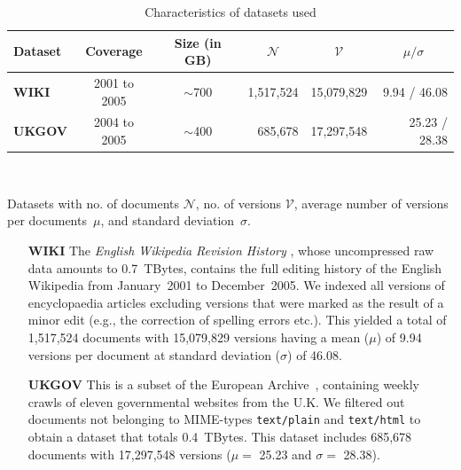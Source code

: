 \begin{table}
  \center
  \begin{tabular}{l c c r r r} 
      \toprule
      { Dataset} & \multicolumn{1}{c}{Coverage}&  \multicolumn{1}{c}{Size (in GB)} & \multicolumn{1}{c}{$\mathcal{N}$} & \multicolumn{1}{c}{$\mathcal{V}$} & \multicolumn{1}{c}{$\mu / \sigma$}\\
      \midrule
      {\bf WIKI} & 2001  to 2005  & $\sim$700 & 1,517,524 & 15,079,829 & 9.94 / 46.08\\

      {\bf UKGOV} & 2004 to 2005 & $\sim$400 & 685,678 & 17,297,548 & 25.23 / 28.38\\
      \bottomrule
    \end{tabular}\\
    \hspace*{2ex}\parbox{0.65\textwidth}{\fontsize{8pt}{8pt}\sffamily Datasets with no. of documents $\mathcal{N}$,
    no. of versions $\mathcal{V}$, average number of versions per documents~${\mu}$, and standard deviation~${\sigma}$.}
  \caption{Characteristics of datasets used}
  \label{tab:datasets}
\end{table}

\begin{enumerate}
\item[\textbf{WIKI}]
{The \emph{English Wikipedia Revision History}
    \cite{wiki}, whose uncompressed raw data amounts to 0.7~TBytes,
    contains the full editing history of the English Wikipedia from
    January~2001 to December~2005. We indexed all versions of
    encyclopaedia articles excluding versions that were marked as the
    result of a minor edit (e.g., the correction of spelling errors
    etc.). This yielded a total of 1,517,524 documents with 15,079,829
    versions having a mean ($\mu$) of 9.94 versions per document at
    standard deviation ($\sigma$) of 46.08.}
    
\item[\textbf{UKGOV}]
  { This is a subset of the European Archive~\cite{ea}, containing
    weekly crawls of eleven governmental websites from the U.K. We
    filtered out documents not belonging to MIME-types
    \texttt{text/plain} and \texttt{text/html} to obtain a dataset
    that totals 0.4~TBytes. This dataset includes 685,678 documents
    with 17,297,548 versions ($\mu = $ 25.23 and $\sigma = $ 28.38).}
    
\end{enumerate}

